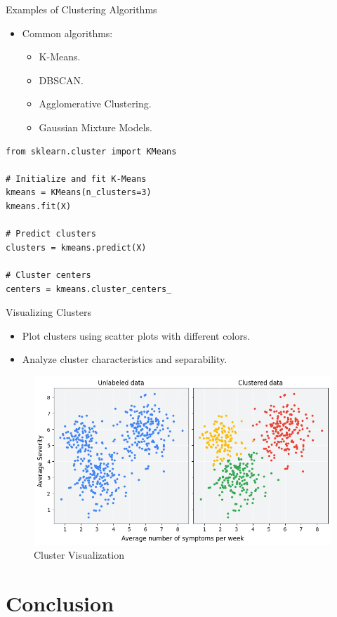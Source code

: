 \documentclass{beamer}
\begin{document}
\begin{frame}[fragile]{Examples of Clustering Algorithms}
\begin{itemize}
    \item Common algorithms:
    \begin{itemize}
        \item K-Means.
        \item DBSCAN.
        \item Agglomerative Clustering.
        \item Gaussian Mixture Models.
    \end{itemize}
\end{itemize}
\begin{lstlisting}
from sklearn.cluster import KMeans

# Initialize and fit K-Means
kmeans = KMeans(n_clusters=3)
kmeans.fit(X)

# Predict clusters
clusters = kmeans.predict(X)

# Cluster centers
centers = kmeans.cluster_centers_
\end{lstlisting}
\end{frame}

\begin{frame}{Visualizing Clusters}
\begin{itemize}
    \item Plot clusters using scatter plots with different colors.
    \item Analyze cluster characteristics and separability.
\end{itemize}
\begin{figure}
    \centering
    \includegraphics[width=0.8\linewidth]{imgs/clusters.png}
    \caption{Cluster Visualization}
\end{figure}
\end{frame}

\section{Conclusion}
\end{document}
